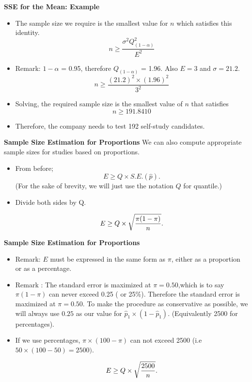 
\textbf{SSE for the Mean: Example}

\begin{itemize}
\item  The sample size we require is the smallest value for $n$ which satisfies this identity.
\[ n \geq \frac{\sigma^2 Q^2_{(1-\alpha)}}{E^2}  \]
\item  Remark: $1-\alpha$ = 0.95, therefore $Q_{(1-\alpha)}$ = 1.96. Also $E=3$ and $\sigma =21.2$.
\[ n \geq \frac{(21.2)^2 \times (1.96)^2}{3^2} \]
\item  Solving, the required sample size is the smallest value of $n$ that satisfies
\[ n \geq 191.8410 \]
\item  Therefore, the company needs to test 192 self-study candidates.
\end{itemize}



\textbf{Sample Size Estimation for Proportions}
We can also compute appropriate sample sizes for studies based on proportions.
\begin{itemize}
\item  From before; \[ E \geq Q \times S.E.(\hat{p}). \]
(For the sake of brevity, we will just use the notation $Q$ for quantile.)

\item  Divide both sides by Q.

\[ E \geq Q \times \sqrt{ {\pi(1-\pi)  \over n} }. \]

\end{itemize}



\textbf{Sample Size Estimation for Proportions}
\begin{itemize}
\item  Remark: $E$ must be expressed in the same form as $\pi$, either as a proportion or as a percentage.
\item  Remark : The standard error is maximized at $\pi = 0.50$,which is to say $\pi(1-\pi)$ can never exceed 0.25 ( or 25\%). Therefore the standard error is maximized at $\pi = 0.50$. To make the procedure as conservative as possible, we will always use $0.25$ as our value for $\hat{p}_1 \times (1 - \hat{p}_1)$. (Equivalently 2500 for percentages).
\item  If we use percentages, $\pi \times (100-\pi)$ can not exceed 2500 (i.e $ 50 \times (100-50)=2500)$.

\[ E \geq Q \times \sqrt{{2500 \over n}}. \]


\end{itemize}


